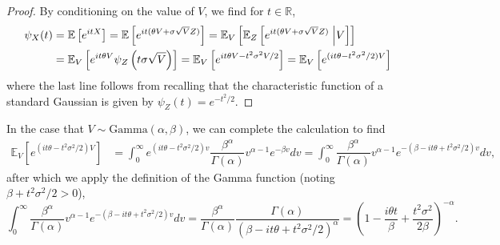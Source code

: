 \documentclass{article}
\begin{document}
\begin{proof}\label{VGcf}
   By conditioning on the value of $V$, we find for $t\in\mathbb{R}$,
   \begin{align}
       \psi_X(t) &= \mathbb{E}\left[e^{itX}\right] = \mathbb{E}\left[e^{it(\theta V+\sigma\sqrt{V}Z)}\right]=\mathbb{E}_V\left[\mathbb{E}_Z\left[e^{it(\theta V+\sigma\sqrt{V}Z)}\hspace{0.1cm}\Big\vert V\right]\right] \\
       &= \mathbb{E}_V\left[e^{it\theta V}\psi_Z\left(t\sigma\sqrt{V}\right)\right] = \mathbb{E}_V\left[e^{it\theta V- t^2\sigma^2V/2}\right] = \mathbb{E}_V\left[e^{(it\theta- t^2\sigma^2/2)V}\right]
   \end{align}
   where the last line follows from recalling that the characteristic function of a standard Gaussian is given by $\psi_Z(t) = e^{-t^2/2}$.
\end{proof}
\begin{cor}
    In the case that $V\sim \text{Gamma}(\alpha, \beta)$, we can complete the calculation to find
    \begin{align}
        \mathbb{E}_V\left[e^{(it\theta- t^2\sigma^2/2)V}\right] &=\int_{0}^\infty e^{(it\theta- t^2\sigma^2/2)v}\dfrac{\beta^\alpha}{\Gamma(\alpha)}v^{\alpha-1}e^{-\beta v}dv = \int_{0}^\infty \dfrac{\beta^\alpha}{\Gamma(\alpha)}v^{\alpha-1}e^{-(\beta-it\theta+t^2\sigma^2/2)v} dv,\label{useV}
    \end{align}
    after which we apply the definition of the Gamma function (noting $\beta+t^2\sigma^2/2>0$),
    \begin{equation}
        \int_{0}^\infty\dfrac{\beta^\alpha}{\Gamma(\alpha)}v^{\alpha-1}e^{-(\beta-it\theta+t^2\sigma^2/2)v} dv = \dfrac{\beta^\alpha}{\Gamma(\alpha)}\dfrac{\Gamma(\alpha)}{\left(\beta-it\theta+t^2\sigma^2/2\right)^\alpha} = \left(1 - \frac{i\theta t}{\beta} + \dfrac{t^2\sigma^2}{2\beta}\right)^{-\alpha}.
    \end{equation}
\end{cor} 
\end{document}
